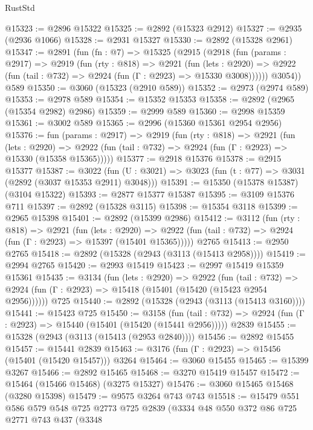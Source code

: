 \begin{lexlean}{RustStd}
\begin{coremodule}
@15323 := @2896 @15322
@15325 := @2892 (@15323 @2912)
@15327 := @2935 (@2936 @1066)
@15328 := @2931 @15327
@15330 := @2892 (@15328 @2961)
@15347 := @2891
    (fun (fn : @7) =>
    @15325
      (@2915
        (@2918
          (fun (params : @2917) =>
          @2919
            (fun (rty : @818) =>
            @2921
              (fun (lets : @2920) =>
              @2922 (fun (tail : @732) => @2924 (fun (Γ : @2923) => @15330 @3008))))))
        @3054))
    @589
@15350 := @3060 (@15323 (@2910 @589))
@15352 := @2973 (@2974 @589)
@15353 := @2978 @589
@15354 := @15352 @15353
@15358 := @2892 (@2965 (@15354 @2982) @2986)
@15359 := @2999 @589
@15360 := @2998 @15359
@15361 := @3002 @589
@15365 := @2996 (@15360 @15361 @2954 @2956)
@15376 := fun (params : @2917) =>
  @2919
    (fun (rty : @818) =>
    @2921
      (fun (lets : @2920) =>
      @2922 (fun (tail : @732) => @2924 (fun (Γ : @2923) => @15330 (@15358 @15365)))))
@15377 := @2918 @15376
@15378 := @2915 @15377
@15387 := @3022
    (fun (U : @3021) => @3023 (fun (t : @77) => @3031 (@2892 (@3037 @15353 @2911) @3048)))
@15391 := @15350 (@15378 @15387) (@3104 @15322)
@15393 := @2877 @15377 @15387
@15395 := @3109 @15376 @711
@15397 := @2892 (@15328 @3115)
@15398 := @15354 @3118
@15399 := @2965 @15398
@15401 := @2892 (@15399 @2986)
@15412 := @3112
    (fun (rty : @818) =>
    @2921
      (fun (lets : @2920) =>
      @2922 (fun (tail : @732) => @2924 (fun (Γ : @2923) => @15397 (@15401 @15365)))))
    @2765
@15413 := @2950 @2765
@15418 := @2892 (@15328 (@2943 (@3113 (@15413 @2958))))
@15419 := @2994 @2765
@15420 := @2993 @15419
@15423 := @2997 @15419 @15359 @15361
@15435 := @3134
    (fun (lets : @2920) =>
    @2922
      (fun (tail : @732) =>
      @2924 (fun (Γ : @2923) => @15418 (@15401 (@15420 (@15423 @2954 @2956))))))
    @725
@15440 := @2892 (@15328 (@2943 (@3113 (@15413 @3160))))
@15441 := @15423 @725
@15450 := @3158
    (fun (tail : @732) => @2924 (fun (Γ : @2923) => @15440 (@15401 (@15420 (@15441 @2956)))))
    @2839
@15455 := @15328 (@2943 (@3113 (@15413 (@2953 @2840))))
@15456 := @2892 @15455
@15457 := @15441 @2839
@15463 := @3176 (fun (Γ : @2923) => @15456 (@15401 (@15420 @15457))) @3264
@15464 := @3060 @15455
@15465 := @15399 @3267
@15466 := @2892 @15465
@15468 := @3270 @15419 @15457
@15472 := @15464 (@15466 @15468) (@3275 @15327)
@15476 := @3060 @15465 @15468 (@3280 @15398)
@15479 := @9575 @3264 @743 @743
@15518 := @15479
    @551
    @586
    @579
    @548
    @725
    @2773
    @725
    @2839
    (@3334
      @48
      @550
      @372
      @86
      @725
      @2771
      @743
      @437
      (@3348

\end{coremodule}
\end{lexlean}
